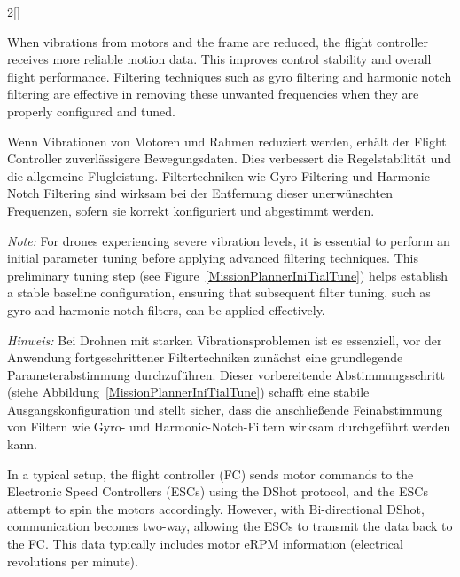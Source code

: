 \begin{paracol}{2}[]
\coleng

When vibrations from motors and the frame are reduced, the flight controller receives more reliable motion data. This improves control stability and overall flight performance. Filtering techniques such as gyro filtering and harmonic notch filtering are effective in removing these unwanted frequencies when they are properly configured and tuned.

\colger

Wenn Vibrationen von Motoren und Rahmen reduziert werden, erhält der Flight Controller zuverlässigere Bewegungsdaten. Dies verbessert die Regelstabilität und die allgemeine Flugleistung. Filtertechniken wie Gyro-Filtering und Harmonic Notch Filtering sind wirksam bei der Entfernung dieser unerwünschten Frequenzen, sofern sie korrekt konfiguriert und abgestimmt werden.

\coleng

\textsl{Note:} For drones experiencing severe vibration levels, it is essential to perform an initial parameter tuning before applying advanced filtering techniques. This preliminary tuning step (see Figure~\ref{MissionPlannerIniTialTune}) helps establish a stable baseline configuration, ensuring that subsequent filter tuning, such as gyro and harmonic notch filters, can be applied effectively.

\colger

\textsl{Hinweis:} Bei Drohnen mit starken Vibrationsproblemen ist es essenziell, vor der Anwendung fortgeschrittener Filtertechniken zunächst eine grundlegende Parameterabstimmung durchzuführen. Dieser vorbereitende Abstimmungsschritt (siehe Abbildung~\ref{MissionPlannerIniTialTune}) schafft eine stabile Ausgangskonfiguration und stellt sicher, dass die anschließende Feinabstimmung von Filtern wie Gyro- und Harmonic-Notch-Filtern wirksam durchgeführt werden kann.

\colende

\renewcommand{\deutschertitel}{Bi-direktionales DShot und Motorfrequenzen aktivieren}
\renewcommand{\englischertitel}{Enable Bi-directional DShot and Motor Frequencies}
\makrounterunterabschnitt
\label{EnableDshotAndMotorFrequencies}

In a typical setup, the flight controller (FC) sends motor commands to the Electronic Speed Controllers (ESCs) using the DShot protocol, and the ESCs attempt to spin the motors accordingly. However, with Bi-directional DShot, communication becomes two-way, allowing the ESCs to transmit the data back to the FC. This data typically includes motor eRPM information (electrical revolutions per minute).


\end{paracol}
